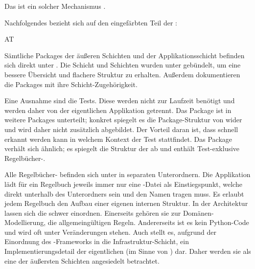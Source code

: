 Das  ist ein solcher Mechanismus \parencites(\vgl)()[][Seite 195 bis 212]{PYTHON-Jaworski2021}{REALISIERUNG-Fowler2004}.

Nachfolgendes bezieht sich \insb auf den eingefärbten Teil der :

\begin{enumerateWithCode}[0em plus 1em]{AT}
    \item Sämtliche Packages der äußeren Schichten und der Applikationsschicht befinden sich direkt unter .
    Die  Schicht und  Schichten wurden unter  gebündelt, um eine bessere Übersicht und flachere Struktur zu erhalten.
    Außerdem dokumentieren die Packages mit  ihre Schicht-Zugehörigkeit.

    \item\label{itm:AT.Tests} Eine Ausnahme sind die Tests.
    Diese werden nicht zur Laufzeit benötigt und werden daher von der eigentlichen Applikation getrennt.
    Das  Package ist in weitere Packages unterteilt; konkret spiegelt es die Package-Struktur von  wider und wird daher nicht zusätzlich abgebildet.
    Der Vorteil daran ist, dass schnell erkannt werden kann in welchem Kontext der Test stattfindet.
    Das Package  verhält sich ähnlich; es spiegelt die Struktur der  ab und enthält Test-exklusive Regelbücher-.

    \item\label{itm:A.LpEntrypoint} Alle Regelbücher- befinden sich unter  in separaten Unterordnern.
    Die Applikation lädt für ein Regelbuch jeweils immer nur eine -Datei als Einstiegspunkt, welche direkt unterhalb des Unterordners sein und den Namen  tragen muss.
    Es erlaubt jedem Regelbuch den Aufbau einer eigenen internen Struktur.
    In der Architektur lassen sich die  schwer einordnen.
    Einerseits gehören sie zur Domänen-Modellierung, \insb die allgemeingültigen Regeln.
    Andererseits ist es kein Python-Code und wird oft unter Veränderungen stehen.
    Auch stellt es, aufgrund der Einordnung des -Frameworks in die Infrastruktur-Schicht, ein Implementierungsdetail der eigentlichen  (im Sinne von ) dar.
    Daher werden sie als eine der äußersten Schichten angesiedelt betrachtet.


\end{enumerateWithCode}
